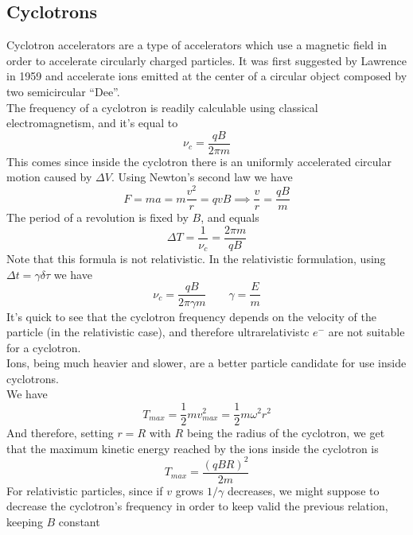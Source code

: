 \documentclass[../qm.tex]{subfiles}
\begin{document}
\subsection{Cyclotrons}
Cyclotron accelerators are a type of accelerators which use a magnetic field in order to accelerate circularly charged particles. It was first suggested by Lawrence in 1959 and accelerate ions emitted at the center of a circular object composed by two semicircular ``Dee''.\\
The frequency of a cyclotron is readily calculable using classical electromagnetism, and it's equal to
\begin{equation}
	\nu_c=\frac{qB}{2\pi m}
	\label{eq:cyclotronfreq}
\end{equation}
This comes since inside the cyclotron there is an uniformly accelerated circular motion caused by $\Delta V$. Using Newton's second law we have
\begin{equation*}
	F=ma=m\frac{v^2}{r}=qvB\implies{}\frac{v}{r}=\frac{qB}{m}
\end{equation*}
The period of a revolution is fixed by $B$, and equals
\begin{equation*}
	\Delta T=\frac{1}{\nu_c}=\frac{2\pi m}{qB}
\end{equation*}
Note that this formula is not relativistic. In the relativistic formulation, using $\Delta t=\gamma\delta\tau$ we have
\begin{equation}
	\nu_c=\frac{qB}{2\pi\gamma m}\qquad\gamma=\frac{E}{m}
	\label{eq:relcycfreq}
\end{equation}
It's quick to see that the cyclotron frequency depends on the velocity of the particle (in the relativistic case), and therefore ultrarelativistc $e^-$ are not suitable for a cyclotron.\\
Ions, being much heavier and slower, are a better particle candidate for use inside cyclotrons.\\
We have
\begin{equation*}
	T_{max}=\frac{1}{2}mv_{max}^2=\frac{1}{2}m\omega^2r^2
\end{equation*}
And therefore, setting $r=R$ with $R$ being the radius of the cyclotron, we get that the maximum kinetic energy reached by the ions inside the cyclotron is
\begin{equation}
	T_{max}=\frac{(qBR)^2}{2m}
	\label{eq:cycmaxtion}
\end{equation}
For relativistic particles, since if $v$ grows $1/\gamma$ decreases, we might suppose to decrease the cyclotron's frequency in order to keep valid the previous relation, keeping $B$ constant\\
\end{document}

